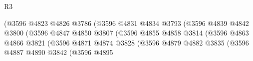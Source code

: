 \begin{lexlean}{R3}
\begin{coremodule}
                                                      (@3596
                                                        @4823
                                                        @4826
                                                        @3786
                                                        (@3596
                                                          @4831
                                                          @4834
                                                          @3793
                                                          (@3596
                                                            @4839
                                                            @4842
                                                            @3800
                                                            (@3596
                                                              @4847
                                                              @4850
                                                              @3807
                                                              (@3596
                                                                @4855
                                                                @4858
                                                                @3814
                                                                (@3596
                                                                  @4863
                                                                  @4866
                                                                  @3821
                                                                  (@3596
                                                                    @4871
                                                                    @4874
                                                                    @3828
                                                                    (@3596
                                                                      @4879
                                                                      @4882
                                                                      @3835
                                                                      (@3596
                                                                        @4887
                                                                        @4890
                                                                        @3842
                                                                        (@3596
                                                                          @4895

\end{coremodule}
\end{lexlean}
